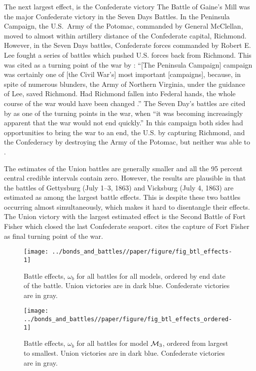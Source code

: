 The next largest effect, is the Confederate victory The Battle of Gaine's Mill was the major Confederate victory in the Seven Days Battles.
In the Peninsula Campaign, the U.S.\ Army of the Potomac, commanded by General McClellan, moved to almost within artillery distance of the Confederate capital, Richmond.
However, in the Seven Days battles, Confederate forces commanded by Robert E. Lee fought a series of battles which pushed U.S. forces back from Richmond.
This was cited as a turning point of the war by \textcite{Fuller1942a}: ``[The Peninsula Campaign] campaign was certainly one of [the Civil War's] most important [campaigns], because, in spite of numerous blunders, the Army of Northern Virginia, under the guidance of Lee, saved Richmond. Had Richmond fallen into Federal hands, the whole course of the war would have been changed \parencite[206]{Fuller1942a}.''
The Seven Day's battles are cited by \textcite[145]{Reiter2009} as one of the turning points in the war, when ``it was becoming increasingly apparent that the war would not end quickly.''
In this campaign both sides had opportunities to bring the war to an end, the U.S.  by capturing Richmond, and the Confederacy by destroying the Army of the Potomac, but neither was able to \parencite[Chapter6]{Fuller1942a}. 

The estimates of the Union battles are generally smaller and all the 95 percent central credible intervals contain zero.
However, the results are plausible in that the battles of Gettysburg (July 1--3, 1863) and Vicksburg (July 4, 1863) are estimated as among the largest battle effects.
This is despite these two battles occurring almost simultaneously, which makes it hard to disentangle their effects.
The Union victory with the largest estimated effect is the Second Battle of Fort Fisher which closed the last Confederate seaport. 
\textcite[154]{Reiter2009} cites the capture of  Fort Fisher as final turning point of the war.

\begin{figure}[!htpb]
  \centering
  \texttt{[image: ../bonds\_and\_battles//paper/figure/fig\_btl\_effects-1]}
  \caption[Battle effects on log-yields for all models]{Battle effects, $\omega_{b}$ for all battles for all models, ordered by end date of the battle.
    Union victories are in dark blue. Confederate victories are in gray.
  }
  \label{bonds:fig:btl_effects}
\end{figure}

\begin{figure}[!htpb]
  \centering
  \texttt{[image: ../bonds\_and\_battles//paper/figure/fig\_btl\_effects\_ordered-1]}  
  \caption[Battle effects for model $\Model{3}$, ordered by magnitude]{
    Battle effects, $\omega_{b}$ for all battles for model $\Model{3}$, ordered from largest to smallest.
    Union victories are in dark blue. Confederate victories are in gray.
  }
  \label{bonds:fig:btl_effects_ordered}
\end{figure}

